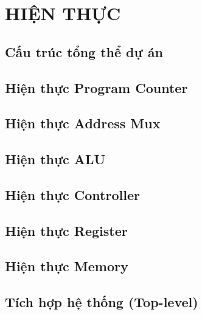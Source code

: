 \section{HIỆN THỰC}

\subsection{Cấu trúc tổng thể dự án}


\subsection{Hiện thực Program Counter}


\subsection{Hiện thực Address Mux}


\subsection{Hiện thực ALU}


\subsection{Hiện thực Controller}


\subsection{Hiện thực Register}


\subsection{Hiện thực Memory}


\subsection{Tích hợp hệ thống (Top-level)}
